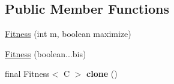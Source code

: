 \subsection*{Public Member Functions}
\begin{CompactItemize}
\item 
\hyperlink{classjenes_1_1population_1_1_fitness_3_01_c_01extends_01_chromosome_01_4_ba60bd43d62c74ca35946ce9c75bff8f}{Fitness} (int m, boolean maximize)
\item 
\hyperlink{classjenes_1_1population_1_1_fitness_3_01_c_01extends_01_chromosome_01_4_57836e06b6476c09409f771be28dad74}{Fitness} (boolean...bis)
\item 
\hypertarget{classjenes_1_1population_1_1_fitness_3_01_c_01extends_01_chromosome_01_4_b685fe3afbba1f4676d363656bfba81c}{
final Fitness$<$ C $>$ \textbf{clone} ()}
\label{classjenes_1_1population_1_1_fitness_3_01_c_01extends_01_chromosome_01_4_b685fe3afbba1f4676d363656bfba81c}


\end{CompactItemize}
